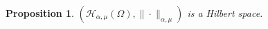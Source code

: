 \documentclass[12pt,a4paper,intlimits,sumlimits]{amsart}
\def \N {\mathbb{N}}
\def \R {\mathbb{R}}
\def \Q {\mathcal Q}
\theoremstyle{definition}
\theoremstyle{plain}
\newtheorem{proposition}[definition]{Proposition}
\numberwithin{equation}{section}
\renewcommand{\ge}{\geqslant}
\begin{document}
%
%


\begin{proposition}
$(\mathcal{H}_{\alpha,\mu}(\Omega), \|\cdot\|_{\alpha, \mu})$ is a Hilbert space.
\end{proposition}
\end{document}
